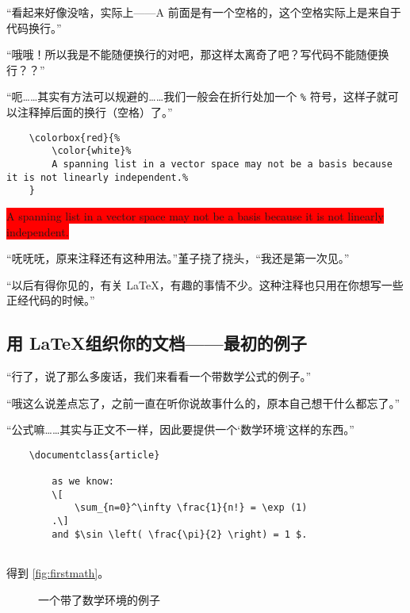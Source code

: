 “看起来好像没啥，实际上——A 前面是有一个空格的，这个空格实际上是来自于代码换行。”

“哦哦！所以我是不能随便换行的对吧，那这样太离奇了吧？写代码不能随便换行？？”

“呃……其实有方法可以规避的……我们一般会在折行处加一个 \verb"%" 符号，这样子就可以注释掉后面的换行（空格）了。”

\begin{lstlisting}
    \colorbox{red}{%
        \color{white}%
        A spanning list in a vector space may not be a basis because it is not linearly independent.%
    }
\end{lstlisting}

\begin{center}\footnotesize
    \colorbox{red}{%
        \color{white}%
        A spanning list in a vector space may not be a basis because it is not linearly independent.%
    }
\end{center}

“呒呒呒，原来注释还有这种用法。”堇子挠了挠头，“我还是第一次见。”

“以后有得你见的，有关 \LaTeX，有趣的事情不少。这种注释也只用在你想写一些正经代码的时候。”

\subsection{用 \LaTeX 组织你的文档——最初的例子}

“行了，说了那么多废话，我们来看看一个带数学公式的例子。”

“哦这么说差点忘了，之前一直在听你说故事什么的，原本自己想干什么都忘了。”

“公式嘛……其实与正文不一样，因此要提供一个‘数学环境’这样的东西。”

\begin{lstlisting}
    \documentclass{article}
    
        as we know:
        \[
            \sum_{n=0}^\infty \frac{1}{n!} = \exp (1)
        .\]
        and $\sin \left( \frac{\pi}{2} \right) = 1 $.
    
\end{lstlisting}

得到 \autoref{fig:firstmath}。

\begin{figure}[th]
    \centering
    \caption{一个带了数学环境的例子}
    \label{fig:firstmath}
\end{figure}

